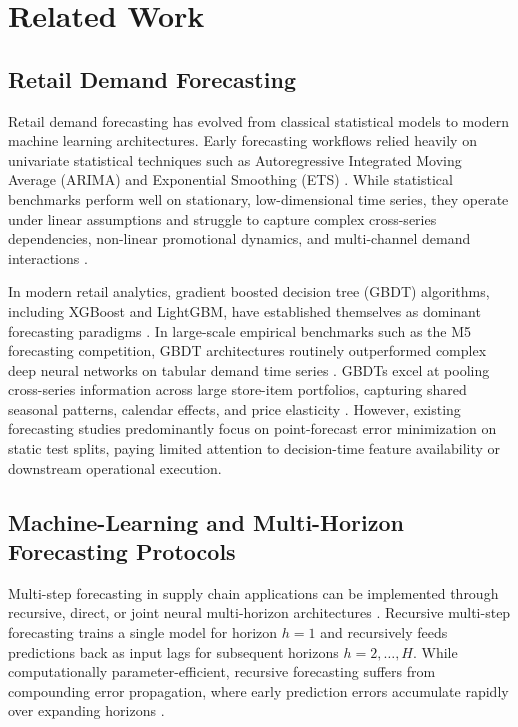 \section{Related Work}

\subsection{Retail Demand Forecasting}
Retail demand forecasting has evolved from classical statistical models to modern machine learning architectures. Early forecasting workflows relied heavily on univariate statistical techniques such as Autoregressive Integrated Moving Average (ARIMA) and Exponential Smoothing (ETS) \cite{mustapha2025forecasting}. While statistical benchmarks perform well on stationary, low-dimensional time series, they operate under linear assumptions and struggle to capture complex cross-series dependencies, non-linear promotional dynamics, and multi-channel demand interactions \cite{syntetos2016supply, yeesin2024application}. 

In modern retail analytics, gradient boosted decision tree (GBDT) algorithms, including XGBoost and LightGBM, have established themselves as dominant forecasting paradigms \cite{chen2016xgboost, hobor2026comparative}. In large-scale empirical benchmarks such as the M5 forecasting competition, GBDT architectures routinely outperformed complex deep neural networks on tabular demand time series \cite{makridakis2022m5}. GBDTs excel at pooling cross-series information across large store-item portfolios, capturing shared seasonal patterns, calendar effects, and price elasticity \cite{mitra2022comparative, alghurabli2025ai}. However, existing forecasting studies predominantly focus on point-forecast error minimization on static test splits, paying limited attention to decision-time feature availability or downstream operational execution.

\subsection{Machine-Learning and Multi-Horizon Forecasting Protocols}
Multi-step forecasting in supply chain applications can be implemented through recursive, direct, or joint neural multi-horizon architectures \cite{tiwari2026explainable}. Recursive multi-step forecasting trains a single model for horizon $h=1$ and recursively feeds predictions back as input lags for subsequent horizons $h=2,\dots,H$. While computationally parameter-efficient, recursive forecasting suffers from compounding error propagation, where early prediction errors accumulate rapidly over expanding horizons \cite{syntetos2016supply}.

